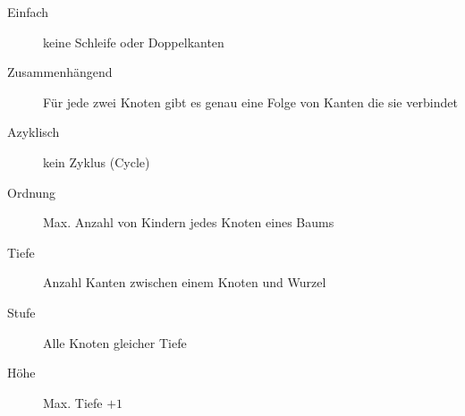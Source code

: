 \documentclass[uniLeipzig]{merkzettel}
\begin{document}
\begin{mzImportant}
  \begin{description}
    \item [Einfach] keine Schleife
          oder Doppelkanten

    \item [Zusammenhängend]
          Für jede zwei Knoten gibt es genau eine Folge von Kanten die sie verbindet

    \item [Azyklisch]
          kein Zyklus (Cycle)
  \end{description}
\end{mzImportant}

\begin{mzImportant}
  \begin{description}
    \item[Ordnung] Max. Anzahl von Kindern jedes Knoten eines Baums

    \item[Tiefe] Anzahl Kanten zwischen einem Knoten und Wurzel

    \item[Stufe] Alle Knoten gleicher Tiefe

    \item[Höhe] Max. Tiefe $+ 1$
  \end{description}
\end{mzImportant}
\end{document}
